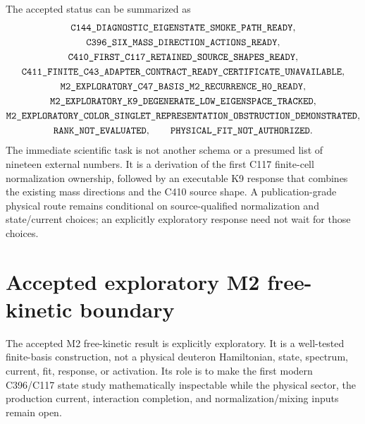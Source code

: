 \documentclass[11pt,oneside]{book}
\newcommand{\statuscode}[1]{\text{\ttfamily\detokenize{#1}}}
\begin{document}
The accepted status can be summarized as
\begin{equation}
 \begin{gathered}
 \statuscode{C144_DIAGNOSTIC_EIGENSTATE_SMOKE_PATH_READY},\\
 \statuscode{C396_SIX_MASS_DIRECTION_ACTIONS_READY},\\
 \statuscode{C410_FIRST_C117_RETAINED_SOURCE_SHAPES_READY},\\
 \statuscode{C411_FINITE_C43_ADAPTER_CONTRACT_READY_CERTIFICATE_UNAVAILABLE},\\
 \statuscode{M2_EXPLORATORY_C47_BASIS_M2_RECURRENCE_H0_READY},\\
 \statuscode{M2_EXPLORATORY_K9_DEGENERATE_LOW_EIGENSPACE_TRACKED},\\
 \statuscode{M2_EXPLORATORY_COLOR_SINGLET_REPRESENTATION_OBSTRUCTION_DEMONSTRATED},\\
 \statuscode{RANK_NOT_EVALUATED},\qquad
 \statuscode{PHYSICAL_FIT_NOT_AUTHORIZED}.
 \end{gathered}
 \label{eq:accepted-c411-status}
\end{equation}
The immediate scientific task is not another schema or a presumed list of nineteen external numbers.  It is a derivation of the first C117 finite-cell normalization ownership, followed by an executable K9 response that combines the existing mass directions and the C410 source shape.  A publication-grade physical route remains conditional on source-qualified normalization and state/current choices; an explicitly exploratory response need not wait for those choices.

\section{Accepted exploratory M2 free-kinetic boundary}
\label{sec:m2-exploratory-h0}

The accepted M2 free-kinetic result is explicitly exploratory. It is a
well-tested finite-basis construction, not a physical deuteron Hamiltonian,
state, spectrum, current, fit, response, or activation. Its role is to make
the first modern C396/C117 state study mathematically inspectable while the
physical sector, the production current, interaction completion, and
normalization/mixing inputs remain open.
\end{document}
